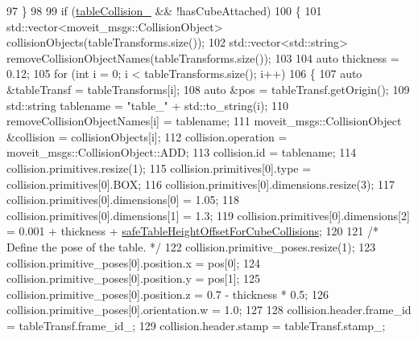 \begin{DoxyCode}
97                     \}
98 
99                     \textcolor{keywordflow}{if} (\hyperlink{classsm__moveit__4_1_1cl__perception__system_1_1CpSimulatedGazeboPerception_a64beecc85d97c62bc4f884f4601d9c6a}{tableCollision\_} && !hasCubeAttached)
100                     \{
101                         std::vector<moveit\_msgs::CollisionObject> collisionObjects(tableTransforms.size());
102                         std::vector<std::string> removeCollisionObjectNames(tableTransforms.size());
103 
104                         \textcolor{keyword}{auto} thickness = 0.12;
105                         \textcolor{keywordflow}{for} (\textcolor{keywordtype}{int} i = 0; i < tableTransforms.size(); i++)
106                         \{
107                             \textcolor{keyword}{auto} &tableTransf = tableTransforms[i];
108                             \textcolor{keyword}{auto} &pos = tableTransf.getOrigin();
109                             std::string tablename = \textcolor{stringliteral}{"table\_"} + std::to\_string(i);
110                             removeCollisionObjectNames[i] = tablename;
111                             moveit\_msgs::CollisionObject &collision = collisionObjects[i];
112                             collision.operation = moveit\_msgs::CollisionObject::ADD;
113                             collision.id = tablename;
114                             collision.primitives.resize(1);
115                             collision.primitives[0].type = collision.primitives[0].BOX;
116                             collision.primitives[0].dimensions.resize(3);
117                             collision.primitives[0].dimensions[0] = 1.05;
118                             collision.primitives[0].dimensions[1] = 1.3;
119                             collision.primitives[0].dimensions[2] = 0.001 + thickness + 
      \hyperlink{classsm__moveit__4_1_1cl__perception__system_1_1CpSimulatedGazeboPerception_a6b6bafbddde1f72c81bf54aa75872151}{safeTableHeightOffsetForCubeCollisions};
120 
121                             \textcolor{comment}{/* Define the pose of the table. */}
122                             collision.primitive\_poses.resize(1);
123                             collision.primitive\_poses[0].position.x = pos[0];
124                             collision.primitive\_poses[0].position.y = pos[1];
125                             collision.primitive\_poses[0].position.z = 0.7 - thickness * 0.5;
126                             collision.primitive\_poses[0].orientation.w = 1.0;
127 
128                             collision.header.frame\_id = tableTransf.frame\_id\_;
129                             collision.header.stamp = tableTransf.stamp\_;

\end{DoxyCode}
